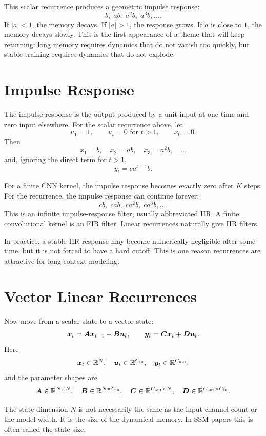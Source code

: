 This scalar recurrence produces a geometric impulse response:
\[
  b,\; ab,\; a^2b,\; a^3b,\ldots.
\]
If $|a|<1$, the memory decays. If $|a|>1$, the response grows. If $a$ is close to $1$,
the memory decays slowly. This is the first appearance of a theme that will keep
returning: long memory requires dynamics that do not vanish too quickly, but stable
training requires dynamics that do not explode.

\section{Impulse Response}

The impulse response is the output produced by a unit input at one time and zero input
elsewhere. For the scalar recurrence above, let
\[
  u_1 = 1,
  \qquad
  u_t = 0 \text{ for } t > 1,
  \qquad
  x_0 = 0.
\]
Then
\[
  x_1=b,\quad x_2=ab,\quad x_3=a^2b,\quad \ldots
\]
and, ignoring the direct term for $t>1$,
\[
  y_t = c a^{t-1} b.
\]

For a finite CNN kernel, the impulse response becomes exactly zero after $K$ steps. For
the recurrence, the impulse response can continue forever:
\[
  c b,\; c a b,\; c a^2 b,\; c a^3 b,\ldots.
\]
This is an infinite impulse-response filter, usually abbreviated IIR. A finite
convolutional kernel is an FIR filter. Linear recurrences naturally give IIR filters.

In practice, a stable IIR response may become numerically negligible after some time, but
it is not forced to have a hard cutoff. This is one reason recurrences are attractive for
long-context modeling.

\section{Vector Linear Recurrences}

Now move from a scalar state to a vector state:
\begin{equation}
  \bm{x}_t = \bm{A} \bm{x}_{t-1} + \bm{B} \bm{u}_t,
  \qquad
  \bm{y}_t = \bm{C} \bm{x}_t + \bm{D} \bm{u}_t.
  \label{eq:discrete-linear-system}
\end{equation}
Here
\[
  \bm{x}_t \in \mathbb{R}^N,\quad
  \bm{u}_t \in \mathbb{R}^{C_{\mathrm{in}}},\quad
  \bm{y}_t \in \mathbb{R}^{C_{\mathrm{out}}},
\]
and the parameter shapes are
\[
  \bm{A} \in \mathbb{R}^{N \times N},\quad
  \bm{B} \in \mathbb{R}^{N \times C_{\mathrm{in}}},\quad
  \bm{C} \in \mathbb{R}^{C_{\mathrm{out}} \times N},\quad
  \bm{D} \in \mathbb{R}^{C_{\mathrm{out}} \times C_{\mathrm{in}}}.
\]

The state dimension $N$ is not necessarily the same as the input channel count or the
model width. It is the size of the dynamical memory. In SSM papers this is often called
the state size.

